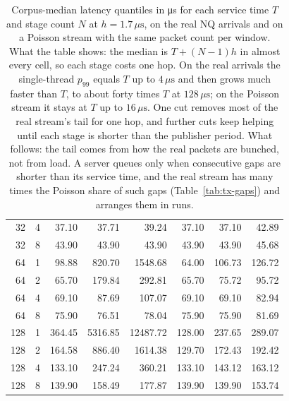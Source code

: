 \documentclass[11pt]{article}
\begin{document}
\begin{table}[tbp]
\begin{tabular}{@{}rr rrr rrr@{}}
32 & 4 &  37.10 &  37.71 &  39.24 &  37.10 &  37.10 &  42.89 \\
32 & 8 &  43.90 &  43.90 &  43.90 &  43.90 &  43.90 &  45.68 \\
\midrule
64 & 1 &  98.88 & 820.70 & 1548.68 &  64.00 & 106.73 & 126.72 \\
64 & 2 &  65.70 & 179.84 & 292.81 &  65.70 &  75.72 &  95.72 \\
64 & 4 &  69.10 &  87.69 & 107.07 &  69.10 &  69.10 &  82.94 \\
64 & 8 &  75.90 &  76.51 &  78.04 &  75.90 &  75.90 &  81.69 \\
\midrule
128 & 1 & 364.45 & 5316.85 & 12487.72 & 128.00 & 237.65 & 289.07 \\
128 & 2 & 164.58 & 886.40 & 1614.38 & 129.70 & 172.43 & 192.42 \\
128 & 4 & 133.10 & 247.24 & 360.21 & 133.10 & 143.12 & 163.12 \\
128 & 8 & 139.90 & 158.49 & 177.87 & 139.90 & 139.90 & 153.74 \\
\bottomrule
\end{tabular}
\caption{Corpus-median latency quantiles in \si{\micro\second} for each service time $T$ and
stage count $N$ at $h = 1.7\,\mu\mathrm{s}$, on the real NQ arrivals and on a Poisson
stream with the same packet count per window. What the table shows: the median is
$T + (N-1)h$ in almost every cell, so each stage costs one hop. On the real arrivals the
single-thread $p_{99}$ equals $T$ up to $4\,\mu\mathrm{s}$ and then grows much faster than
$T$, to about forty times $T$ at $128\,\mu\mathrm{s}$; on the Poisson stream it stays at
$T$ up to $16\,\mu\mathrm{s}$. One cut removes most of the real stream's tail for one hop,
and further cuts keep helping until each stage is shorter than the publisher period.
What follows: the tail comes from how the real packets are bunched, not from load. A
server queues only when consecutive gaps are shorter than its service time, and the real
stream has many times the Poisson share of such gaps (Table~\ref{tab:tx-gaps}) and
arranges them in runs.}
\label{tab:main-corpus}
\end{table}
\end{document}
